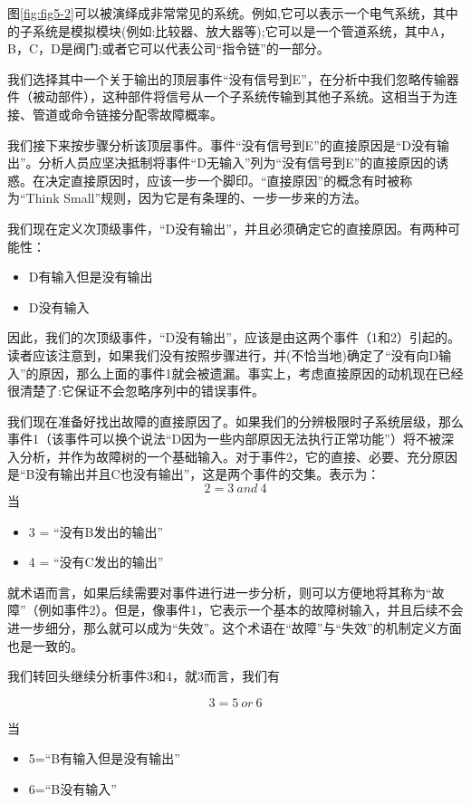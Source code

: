 \documentclass[cn,11pt,chinese]{elegantbook}
\begin{document}
图\ref{fig:fig5-2}可以被演绎成非常常见的系统。例如,它可以表示一个电气系统，其中的子系统是模拟模块(例如:比较器、放大器等);它可以是一个管道系统，其中A，B，C，D是阀门;或者它可以代表公司“指令链”的一部分。

我们选择其中一个关于输出的顶层事件“没有信号到E”，在分析中我们忽略传输器件（被动部件），这种部件将信号从一个子系统传输到其他子系统。这相当于为连接、管道或命令链接分配零故障概率。

我们接下来按步骤分析该顶层事件。事件“没有信号到E”的直接原因是“D没有输出”。分析人员应坚决抵制将事件“D无输入”列为“没有信号到E”的直接原因的诱惑。在决定直接原因时，应该一步一个脚印。“直接原因”的概念有时被称为“Think Small”规则，因为它是有条理的、一步一步来的方法。

我们现在定义次顶级事件，“D没有输出”，并且必须确定它的直接原因。有两种可能性：

\begin{itemize}
\item D有输入但是没有输出
\item D没有输入
\end{itemize}

因此，我们的次顶级事件，“D没有输出”，应该是由这两个事件（1和2）引起的。读者应该注意到，如果我们没有按照步骤进行，并(不恰当地)确定了“没有向D输入”的原因，那么上面的事件1就会被遗漏。事实上，考虑直接原因的动机现在已经很清楚了:它保证不会忽略序列中的错误事件。

我们现在准备好找出故障的直接原因了。如果我们的分辨极限时子系统层级，那么事件1（该事件可以换个说法“D因为一些内部原因无法执行正常功能”）将不被深入分析，并作为故障树的一个基础输入。对于事件2，它的直接、必要、充分原因是“B没有输出并且C也没有输出”，这是两个事件的交集。表示为：
$$ 2=3 \ and \  4 $$
当

\begin{itemize}
\item  3 = “没有B发出的输出”
\item  4 = “没有C发出的输出”
\end{itemize}

就术语而言，如果后续需要对事件进行进一步分析，则可以方便地将其称为“故障”（例如事件2）。但是，像事件1，它表示一个基本的故障树输入，并且后续不会进一步细分，那么就可以成为“失效”。这个术语在“故障”与“失效”的机制定义方面也是一致的。

我们转回头继续分析事件3和4，就3而言，我们有

$$ 3 =5 \ or \ 6 $$

当

\begin{itemize}
	\item  5=“B有输入但是没有输出”
	\item  6=“B没有输入”
\end{itemize}
\end{document}
